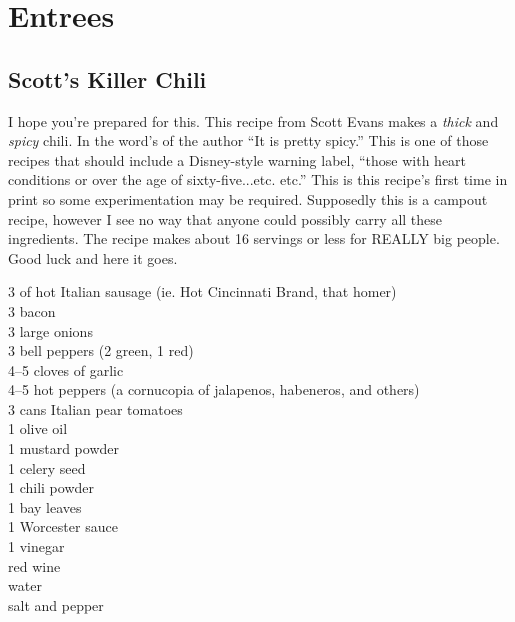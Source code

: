 \chapter{Entrees}

\section{Scott's Killer Chili
}

\begin{open}
  I hope you're prepared for this.  This recipe from Scott Evans makes a {\em
  thick} and {\em spicy} chili.  In the word's of the author ``It is pretty
  spicy.''  This is one of those recipes that should include a Disney-style
  warning label, ``\textellipsis those with heart conditions or over the age of
  sixty-five...etc. etc.''  This is this recipe's first time in print so some
  experimentation may be required.  Supposedly this is a campout recipe, however
  I see no way that anyone could possibly carry all these ingredients. The
  recipe makes about 16 servings or less for REALLY big people.  Good luck and
  here it goes.
\end{open}
\begin{ingredients}
  \SI{3}{\pound} of hot Italian sausage (ie. Hot Cincinnati Brand, that homer) \\
  \SI{3}{\pound} bacon \\
  3 large onions \\
  3 bell peppers (2 green, 1 red) \\
  \numrange{4}{5} cloves of garlic \\
  \numrange{4}{5} hot peppers (a cornucopia of jalapenos, habeneros, and others) \\
  3 cans Italian pear tomatoes \\
  \SI{1}{\tblspoon} olive oil \\
  \SI{1}{\tblspoon} mustard powder \\
  \SI{1}{\tblspoon} celery seed \\
  \SI{1}{\tblspoon} chili powder \\
  \SI{1}{\tblspoon} bay leaves \\
  \SI{1}{\tblspoon} Worcester sauce \\
  \SI{1}{\tblspoon} vinegar \\
  red wine \\
  water \\
  salt and pepper
\end{ingredients}
